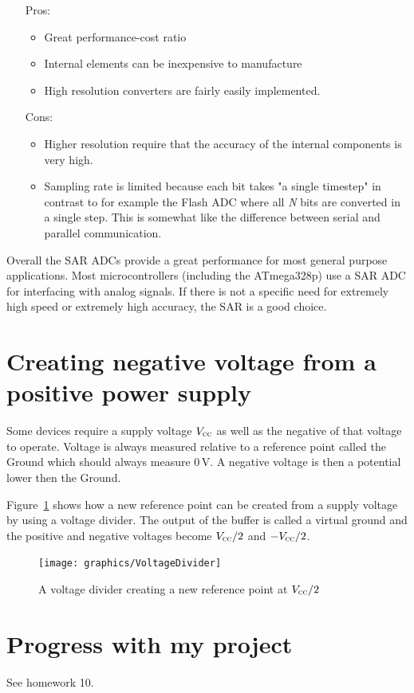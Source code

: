 \documentclass[11pt,a4paper,titlepage]{article}
\newcommand{\V}{\,\textrm{V}}
\begin{document}
	\begin{itemize}
		\item[Pros:]
		\begin{itemize}
			\item Great performance-cost ratio
			\item Internal elements can be inexpensive to manufacture
			\item High resolution converters are fairly easily implemented.
		\end{itemize}
		\item[Cons:]
		\begin{itemize}
			\item Higher resolution require that the accuracy of the internal components is very high.
			\item Sampling rate is limited because each bit takes "a single timestep" in contrast to for example the Flash ADC where all \textit{N} bits are converted in a single step. This is somewhat like the difference between serial and parallel communication.
		\end{itemize}
	\end{itemize}
	
	
	\noindent Overall the SAR ADCs provide a great performance for most general purpose applications. Most microcontrollers (including the ATmega328p) use a SAR ADC for interfacing with analog signals. If there is not a specific need for extremely high speed or extremely high accuracy, the SAR is a good choice.
	
	
	\section{Creating negative voltage from a positive power supply}
	
	Some devices require a supply voltage $V_{\textsc{cc}}$ as well as the negative of that voltage to operate. Voltage is always measured relative to a reference point called the Ground which should always measure 0\V.
	A negative voltage is then a potential lower then the Ground.
	
	Figure~\ref{fig:negvolt} shows how a new reference point can be created from a supply voltage by using a voltage divider. The output of the buffer is called a virtual ground and the positive and negative voltages become $V_{\textsc{cc}}/2$ and $-V_{\textsc{cc}}/2$.
	
	\begin{figure}[H]
		\centering
		\texttt{[image: graphics/VoltageDivider]}
		\caption{A voltage divider creating a new reference point at $V_{\textsc{cc}}/2$}
		\label{fig:negvolt}
	\end{figure}
	
	
	\pagebreak
	\section{Progress with my project}
	
	See homework 10.
	
	
	
\pagebreak
\appendix



\pagebreak
\printbibliography
\end{document}
